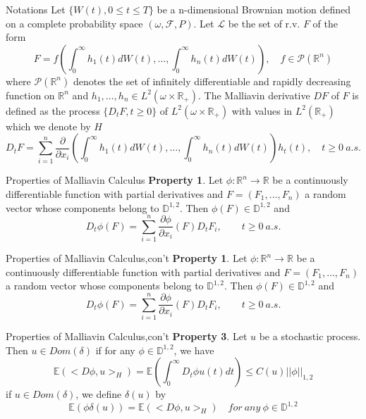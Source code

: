 \documentclass{beamer}
\begin{document}
\begin{frame}{Notations}
Let $\{W(t),0\leq t \leq T\}$ be a n-dimensional Brownian motion defined on a complete probability space $(\omega, \mathcal{F}, P)$. Let $\mathcal{L}$ be the set of r.v. $F$ of the form
$$
F = f\left( \int_0^\infty h_1(t)dW(t),\ldots, \int_0^\infty h_n(t)dW(t) \right), \quad f\in \mathcal{P}(\mathbb{R}^n)
$$
where $\mathcal{P}(\mathbb{R}^n)$ denotes the set of infinitely differentiable and rapidly decreasing function on $\mathbb{R}^n$ and $h_1,\ldots,h_n\in L^2(\omega \times \mathbb{R}_+)$. The Malliavin derivative $DF$ of $F$ is defined as the process $\{D_t F, t\geq 0\}$ of $L^2(\omega \times \mathbb{R}_+)$ with values in $L^2(\mathbb{R}_+)$ which we denote by $H$
$$
D_t F = \sum_{i=1}^{n} \frac{\partial}{\partial x_i} \left( \int_0^\infty h_1(t)dW(t),\ldots, \int_0^\infty h_n(t)dW(t) \right)h_t(t), \quad t\geq 0~a.s.
$$
\end{frame}


\begin{frame}{Properties of Malliavin Calculus}
\textbf{Property 1}. Let $\phi: \mathbb{R}^n \rightarrow \mathbb{R}$ be a continuously differentiable function with partial derivatives and $F=(F_1,\ldots,F_n)$ a random vector whose components belong to $\mathbb{D}^{1,2}$. Then $\phi(F)\in \mathbb{D}^{1,2}$ and
$$
D_t \phi(F) = \sum_{i=1}^{n} \frac{\partial \phi}{\partial x_i} (F) D_t F_i, \qquad t\geq 0~a.s.
$$
\end{frame}


\begin{frame}{Properties of Malliavin Calculus,con't}
\textbf{Property 1}. Let $\phi: \mathbb{R}^n \rightarrow \mathbb{R}$ be a continuously differentiable function with partial derivatives and $F=(F_1,\ldots,F_n)$ a random vector whose components belong to $\mathbb{D}^{1,2}$. Then $\phi(F)\in \mathbb{D}^{1,2}$ and
$$
D_t \phi(F) = \sum_{i=1}^{n} \frac{\partial \phi}{\partial x_i} (F) D_t F_i, \qquad t\geq 0~a.s.
$$
\end{frame}

\begin{frame}{Properties of Malliavin Calculus,con't}
\textbf{Property 3}. Let $u$ be a stochastic process. Then $u\in Dom(\delta)$ if for any $\phi\in \mathbb{D}^{1,2}$, we have
$$
\mathbb{E}(<D\phi,u>_H) = \mathbb{E} \left( \int_0^\infty D_t \phi u(t) dt \right) \leq C(u) ||\phi||_{1,2}
$$
if $u\in Dom(\delta)$, we define $\delta(u)$ by
$$
\mathbb{E}(\phi\delta(u)) = \mathbb{E}(<D\phi,u>_H) \quad for~any~\phi \in \mathbb{D}^{1,2}
$$
\end{frame}
\end{document}

